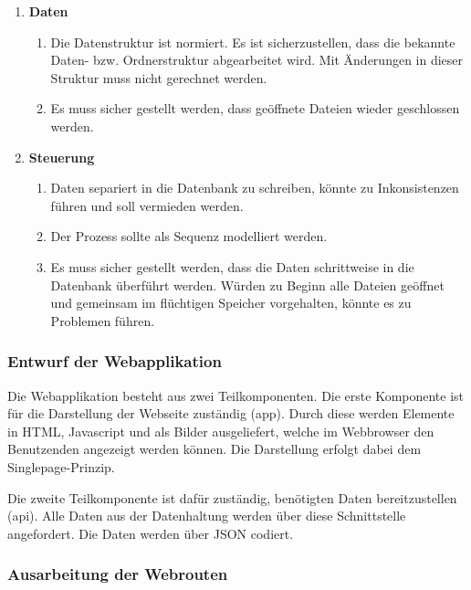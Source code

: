 \begin{enumerate}

\item \textbf{Daten}
    \begin{enumerate}
        \item Die Datenstruktur ist normiert. Es ist sicherzustellen, dass die bekannte Daten- bzw. Ordnerstruktur abgearbeitet wird. Mit Änderungen in dieser Struktur muss nicht gerechnet werden.
        \item Es muss sicher gestellt werden, dass geöffnete Dateien wieder geschlossen werden.
    \end{enumerate}

\item \textbf{Steuerung}
    \begin{enumerate}
        \item Daten separiert in die Datenbank zu schreiben, könnte zu Inkonsistenzen führen und soll vermieden werden.
        \item Der Prozess sollte als Sequenz modelliert werden.
        \item Es muss sicher gestellt werden, dass die Daten schrittweise in die Datenbank überführt werden. Würden zu Beginn alle Dateien geöffnet und gemeinsam im flüchtigen Speicher vorgehalten, könnte es zu Problemen führen.
    \end{enumerate}

\end{enumerate}



\subsubsection{Entwurf der Webapplikation}

Die Webapplikation besteht aus zwei Teilkomponenten. Die erste Komponente ist für die Darstellung der Webseite zuständig (app). Durch diese werden Elemente in  HTML, Javascript und als Bilder ausgeliefert, welche im Webbrowser den Benutzenden angezeigt werden können. Die Darstellung erfolgt dabei dem Singlepage-Prinzip.

Die zweite Teilkomponente ist dafür zuständig, benötigten Daten bereitzustellen (api). Alle Daten aus der Datenhaltung werden über diese Schnittstelle angefordert. Die Daten werden über JSON codiert.


\subsubsection{Ausarbeitung der Webrouten} \label{sec:entwurfRoutes}


